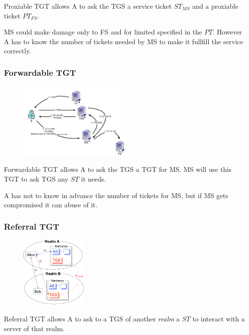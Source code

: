 \documentclass[a4paper,12pt]{article}
\begin{document}
Proxiable TGT allows A to ask the TGS a service ticket $ST_{MS}$ and a proxiable ticket $PT_{FS}$.

MS could make damage only to FS and for limited specified in the $PT$. However A has to know the number of tickets needed by MS to make it fullfill the service correctly.

\subsubsection{Forwardable TGT}

\begin{figure}[H]
  \centering
  \includegraphics[width=0.5\textwidth]{img/forward}
\end{figure}

Forwardable TGT allows A to ask the TGS a TGT for MS. MS will use this TGT to ask TGS any $ST$ it needs.

A has not to know in advance the number of tickets for MS, but if MS gets compromised it can abuse of it.

\subsubsection{Referral TGT}

\begin{figure}[H]
  \centering
  \includegraphics[width=0.3\textwidth]{img/realms}
\end{figure}
Referral TGT allows A to ask to a TGS of another \textit{realm} a $ST$ to interact with a server of that realm.

\newpage
\end{document}
